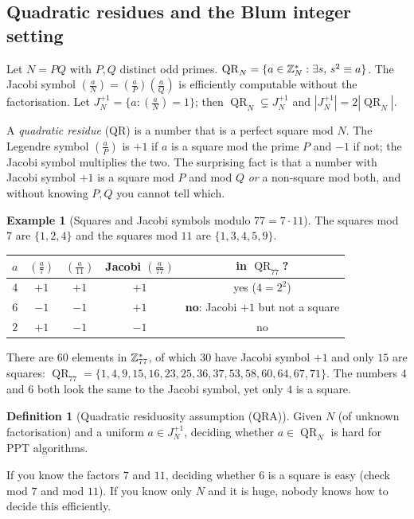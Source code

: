 \documentclass[11pt,a4paper]{report}
\theoremstyle{plain}
\theoremstyle{definition}
\newtheorem{definition}[theorem]{Definition}
\newtheorem{example}[theorem]{Example}
\theoremstyle{remark}
\DeclareMathOperator{\QR}{QR}\DeclareMathOperator{\QNR}{QNR}
\newcommand{\Zs}[1]{\ZZ_{#1}^{*}}
\begin{document}
\subsection{Quadratic residues and the Blum integer setting}
Let $N=PQ$ with $P,Q$ distinct odd primes. $\QR_N=\{a\in\Zs N:\exists s,\,s^2\equiv a\}$. The Jacobi symbol $\left(\frac aN\right)=\left(\frac aP\right)\left(\frac aQ\right)$ is efficiently computable without the factorisation. Let $J_N^{+1}=\{a:(\frac aN)=1\}$; then $\QR_N\subsetneq J_N^{+1}$ and $|J_N^{+1}|=2|\QR_N|$.
\begin{plain}\PE
A \emph{quadratic residue} (QR) is a number that is a perfect square mod $N$. The Legendre symbol $(\frac aP)$ is $+1$ if $a$ is a square mod the prime $P$ and $-1$ if not; the Jacobi symbol multiplies the two. The surprising fact is that a number with Jacobi symbol $+1$ is a square mod $P$ and mod $Q$ \emph{or} a non-square mod both, and without knowing $P,Q$ you cannot tell which.
\end{plain}
\begin{example}[Squares and Jacobi symbols modulo $77=7\cdot11$]
The squares mod $7$ are $\{1,2,4\}$ and the squares mod $11$ are $\{1,3,4,5,9\}$.
\begin{center}
\renewcommand{\arraystretch}{1.2}
\begin{tabular}{@{}c c c c c@{}}
\toprule
$a$ & $(\frac a7)$ & $(\frac a{11})$ & Jacobi $(\frac a{77})$ & in $\QR_{77}$?\\
\midrule
$4$ & $+1$ & $+1$ & $+1$ & yes ($4=2^2$)\\
$6$ & $-1$ & $-1$ & $+1$ & \textbf{no}: Jacobi $+1$ but not a square\\
$2$ & $+1$ & $-1$ & $-1$ & no\\
\bottomrule
\end{tabular}
\end{center}
There are $60$ elements in $\Zs{77}$, of which $30$ have Jacobi symbol $+1$ and only $15$ are squares: $\QR_{77}=\{1,4,9,15,16,23,25,36,37,53,58,60,64,67,71\}$. The numbers $4$ and $6$ both look the same to the Jacobi symbol, yet only $4$ is a square.
\end{example}
\begin{definition}[Quadratic residuosity assumption (QRA)]
Given $N$ (of unknown factorisation) and a uniform $a\in J_N^{+1}$, deciding whether $a\in\QR_N$ is hard for PPT algorithms.
\end{definition}
\begin{plain}\PE
If you know the factors $7$ and $11$, deciding whether $6$ is a square is easy (check mod $7$ and mod $11$). If you know only $N$ and it is huge, nobody knows how to decide this efficiently.
\end{plain}
\end{document}
